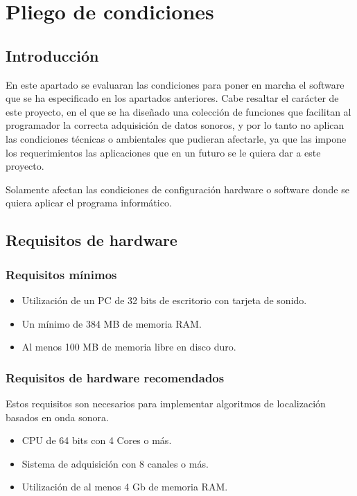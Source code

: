 
\chapter{Pliego de condiciones}
\label{cha:pliego-de-condiciones}

\section{Introducción}

En este apartado se evaluaran las condiciones para poner en marcha el software que se ha especificado en los apartados anteriores. Cabe resaltar el carácter de este proyecto, en el que se ha diseñado una colección de funciones que facilitan al programador la correcta adquisición de datos sonoros, y por lo tanto no aplican las condiciones técnicas o ambientales que pudieran afectarle, ya que las impone los requerimientos las aplicaciones que en un futuro se le quiera dar a este proyecto.

Solamente afectan las condiciones de configuración hardware o software donde se quiera aplicar el programa informático.

\section{Requisitos de hardware}

\subsection{Requisitos mínimos}
\begin{itemize}
  \item Utilización de un PC de 32 bits de escritorio con tarjeta de sonido.
  \item Un mínimo de 384 MB de memoria RAM.
  \item Al menos 100 MB de memoria libre en disco duro.
\end{itemize}

\subsection{Requisitos de hardware recomendados}
Estos requisitos son necesarios para implementar algoritmos de localización basados en onda sonora.
\begin{itemize}
  \item CPU de 64 bits con 4 Cores o más.
  \item Sistema de adquisición con 8 canales o más.
  \item Utilización de al menos 4 Gb de memoria RAM.
\end{itemize}

